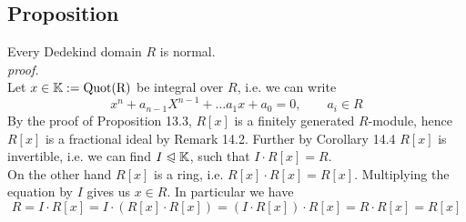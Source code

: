 \documentclass[12pt]{book}
\begin{document}
\begin{spacing}{1.3}
\subsection{Proposition} %
Every Dedekind domain $R$ is normal. \\
\textit{proof.}\\
Let $x \in \mathbb{K}:= \rm{Quot}(R)$ be integral over $R$, i.e. we can write
$$x^n+a_{n-1}X^{n-1} + \ldots a_1x+a_0=0, \qquad a_i \in R$$
By the proof of Proposition 13.3, $R[x]$ is a finitely generated $R$-module, hence $R[x]$ is a fractional ideal by Remark 14.2. Further by Corollary 14.4 $R[x]$ is invertible, i.e. we can find $I \trianglelefteqslant \mathbb{K}$, such that $I \cdot R[x]=R$.\\
On the other hand $R[x]$ is a ring, i.e. $R[x] \cdot R[x] = R[x]$. Multiplying the equation by $I$ gives us $x \in R$. In particular we have
$$R=I \cdot R[x]=I \cdot (R[x] \cdot R[x])=(I \cdot R[x])\cdot R[x]=R \cdot R[x]=R[x]$$


\end{spacing}
\end{document}
